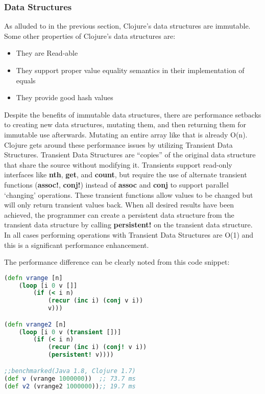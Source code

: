     

\subsubsection{Data Structures}
    
    As alluded to in the previous section, Clojure's data structures are immutable. Some other properties of Clojure's data structures are:
    \begin{itemize}
        \item They are Read-able
        \item They support proper value equality semantics in their implementation of equals
        \item They provide good hash values
    \end{itemize}
    \cite{website:clojure-lang-reference} Despite the benefits of immutable data structures, there are performance setbacks to creating new data structures, mutating them, and then returning them for immutable use afterwards. Mutating an entire array like that is already O(n). Clojure gets around these performance issues by utilizing Transient Data Structures. Transient Data Structures are ``copies'' of the original data structure that share the source without modifying it. Transients support read-only interfaces like \textbf{nth}, \textbf{get}, and \textbf{count}, but require the use of alternate transient functions (\textbf{assoc!}, \textbf{conj!}) instead of \textbf{assoc} and \textbf{conj} to support parallel `changing' operations. These transient functions allow values to be changed but will only return transient values back. When all desired results have been achieved, the programmer can create a persistent data structure from the transient data structure by calling \textbf{persistent!} on the transient data structure. In all cases performing operations with Transient Data Structures are O(1) and this is a significant performance enhancement.
    
    The performance difference can be clearly noted from this code snippet:
	\begin{lstlisting}[language=clojure]
(defn vrange [n]
	(loop [i 0 v []]
		(if (< i n)
			(recur (inc i) (conj v i))
			v)))

(defn vrange2 [n]
	(loop [i 0 v (transient [])]
		(if (< i n)
			(recur (inc i) (conj! v i))
			(persistent! v))))

;;benchmarked(Java 1.8, Clojure 1.7)
(def v (vrange 1000000))  ;; 73.7 ms
(def v2 (vrange2 1000000));; 19.7 ms
	\end{lstlisting}
    

